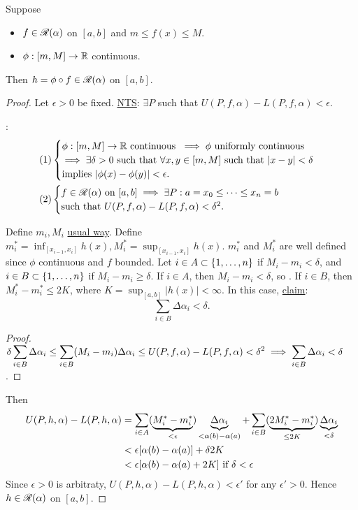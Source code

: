 \documentclass[]{article}
\begin{document}
\begin{recall}
	Suppose
	\begin{itemize}
		\item $f\in\ms R(\alpha)$ on $[a,b]$ and $m\leq f(x)\leq M$.
		\item $\phi:[m,M]\ra\mb R$ continuous.
	\end{itemize}
	Then $h = \phi\circ f\in\ms R(\alpha)$ on $[a,b]$.
\end{recall}
\begin{proof}
	Let $\epsilon>0$ be fixed.
	\ul{NTS}: $\exists P$ such that $U(P,f,\alpha) - L(P,f,\alpha) <\epsilon$.
	\begin{note}:
		\begin{align*}
			(1)
			&\begin{cases}
				\phi:[m,M]\ra\mb R \text{ continuous }\implies \phi \text{ uniformly continuous} \\ 
				\implies \exists \delta>0 \text{ such that }\forall x,y\in[m,M] \text{ such that } |x-y|<\delta \\ 
				\text{implies } |\phi(x)-\phi(y)| < \epsilon.
			\end{cases} \\
			(2)
			&\begin{cases}
				f\in\ms R(\alpha) \text{ on } [a,b] \implies \exists P: a=x_0\leq\dots\leq x_n = b \\
				\text{such that } U(P,f,\alpha)-L(P,f,\alpha) < \delta^2.
			\end{cases}
		\end{align*}
	\end{note}
	Define $m_i,M_i$ \ul{usual way}.
	Define $m_i^* = \inf_{[x_{i-1},x_i]} h(x), M_i^* = \sup_{[x_{i-1},x_i]} h(x)$.
	$m_i^*$ and $M_i^*$ are well defined since $\phi$ continuous and $f$ bounded.
	Let $i\in A\subset\set{1,\dots,n}$ if $M_i-m_i<\delta$, and $i\in B\subset\set{1,\dots,n}$ if $M_i-m_i\geq\delta$.
	If $i\in A$, then $M_i-m_i<\delta$, so .
	If $i\in B$, then $M_i^*-m_i^*\leq 2K$, where $K = \sup_{[a,b]} |h(x)|<\infty$.
	In this case, \ul{claim}: $$\sum_{i\in B} \Delta \alpha_i <\delta.$$
	\begin{proof}
		$\ds \delta \sum_{i\in B} \Delta\alpha_i \leq \sum_{i\in B}(M_i-m_i)\Delta\alpha_i \leq U(P,f,\alpha) - L(P,f,\alpha) < \delta^2 \implies \sum_{i\in B} \Delta\alpha_i<\delta$.
	\end{proof}
	Then
	\begin{align*}
		U(P,h,\alpha)-L(P,h,\alpha)
		&= \sum_{i\in A} (\ub{<\epsilon}{M_i^*-m_i^*}) \ub{<\alpha(b)-\alpha(a)}{\Delta\alpha_i} + \sum_{i\in B} (\ub{\leq2K}{2M_i^*-m_i^*}) \ub{<\delta}{\Delta\alpha_i} \\
		&< \epsilon[\alpha(b)-\alpha(a)] + \delta 2K \\
		&< \epsilon[\alpha(b)-\alpha(a) + 2K] \text{ if } \delta<\epsilon
	\end{align*}
	Since $\epsilon>0$ is arbitraty, $U(P,h,\alpha) - L(P,h,\alpha) < \epsilon'$ for any $\epsilon'>0$.
	Hence $h\in\ms R(\alpha)$ on $[a,b]$.
\end{proof}
\end{document}
